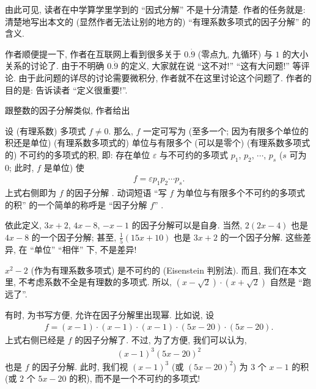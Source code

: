 \begin{example}
    由此可见, 读者在中学算学里学到的 ``因式分解'' 不是十分清楚. 作者的任务就是: 清楚地写出本文的 (显然作者无法让别的地方的) ``有理系数多项式的因子分解'' 的含义.

    作者顺便提一下, 作者在互联网上看到很多关于 $0.\dot{9}$ (零点九, 九循环) 与 $1$ 的大小关系的讨论了. 由于不明确 $0.\dot{9}$ 的定义, 大家就在说 ``这不对!'' ``这有大问题!'' 等评论. 由于此问题的详尽的讨论需要微积分, 作者就不在这里讨论这个问题了. 作者的目的是: 告诉读者 ``定义很重要!''.
\end{example}

跟整数的因子分解类似, 作者给出
\begin{definition}
    设 (有理系数) 多项式 $f \neq 0$. 那么, $f$ 一定可写为 (至多一个; 因为有限多个单位的积还是单位) (有理系数多项式的) 单位与有限多个 (可以是零个) (有理系数多项式的) 不可约的多项式的积, 即: 存在单位 $\varepsilon$ 与不可约的多项式 $p_1$, $p_2$, $\cdots$, $p_s$ ($s$ 可为 $0$; 此时, $f$ 是单位) 使
    \begin{align*}
        f = \varepsilon p_1 p_2 \cdots p_s.
    \end{align*}
    上式右侧即为 $f$ 的因子分解 . 动词短语 ``写 $f$ 为单位与有限多个不可约的多项式的积'' 的一个简单的称呼是 ``因子分解 $f$'' .
\end{definition}

\begin{remark}
    依此定义, $3x + 2$, $4x - 8$, $-x - 1$ 的因子分解可以是自身. 当然, $2(2x - 4)$ 也是 $4x - 8$ 的一个因子分解; 甚至, $\frac{1}{5} (15x + 10)$ 也是 $3x + 2$ 的一个因子分解. 这些差异, 在 ``单位'' ``相伴'' 下, 不是差异!

    $x^2 - 2$ (作为有理系数多项式) 是不可约的 (Eisenstein 判别法). 而且, 我们在本文里, 不考虑系数不全是有理数的多项式. 所以, $(x - \sqrt{2}) \cdot (x + \sqrt{2})$ 自然是 ``跑远了''.
\end{remark}

\begin{remark}
    有时, 为书写方便, 允许在因子分解里出现幂. 比如说, 设
    \begin{align*}
        f = (x-1) \cdot (x-1) \cdot (x-1) \cdot (5x-20) \cdot (5x-20).
    \end{align*}
    上式右侧已经是 $f$ 的因子分解了. 不过, 为了方便, 我们可以认为,
    \begin{align*}
        (x-1)^3 (5x-20)^2
    \end{align*}
    也是 $f$ 的因子分解. 此时, 我们视 $(x-1)^3$ (或 $(5x-20)^2$) 为 $3$ 个 $x-1$ 的积 (或 $2$ 个 $5x-20$ 的积), 而不是一个不可约的多项式!
\end{remark}

